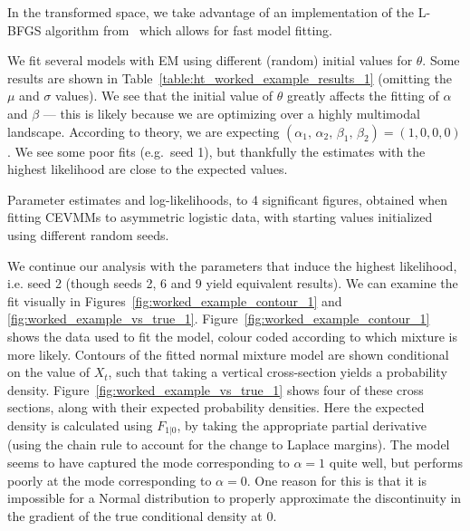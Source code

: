 \documentclass[11pt,twoside,openany]{book}
\numberwithin{Theorem}{chapter}
\numberwithin{Definition}{chapter}
\numberwithin{Lemma}{chapter}
\numberwithin{Algorithm}{chapter}
\numberwithin{equation}{chapter}
\begin{document}
In the transformed space, we take advantage of
an implementation of the L-BFGS algorithm from~\cite{mogensen2018optim} which
allows for fast model fitting.

We fit several models with EM using different (random) initial values
for $\theta$. Some results are shown in
Table~\ref{table:ht_worked_example_results_1} (omitting the $\mu$ and $\sigma$
values).
We see that the initial value of $\theta$ greatly affects the fitting of $\alpha$ and $\beta$ ---
this is likely because we are optimizing over a highly multimodal landscape.
According to theory, we are expecting $(\alpha_1,\,\alpha_2,\,\beta_1,\,\beta_2) = (1,0,0,0)$.
We see some poor fits (e.g.\ seed 1), but thankfully the estimates
with the highest likelihood are close to the expected values.



\begin{table}[htp]\centering
   \caption{Parameter estimates
  and log-likelihoods, to 4 significant figures, obtained when fitting CEVMMs
to asymmetric logistic data, with starting values initialized using different
random seeds.\label{table:ht_worked_example_results_1} }
\end{table}

We continue our analysis with the parameters that induce the highest
likelihood, i.e.
seed 2 (though seeds 2, 6 and 9 yield equivalent results).
We can examine the fit visually in Figures~\ref{fig:worked_example_contour_1} and
\ref{fig:worked_example_vs_true_1}. Figure~\ref{fig:worked_example_contour_1}
shows the data used to fit the model, colour coded according to which mixture is
more likely. Contours of the fitted normal mixture model are shown conditional on the value of $X_t$,
such that taking a vertical cross-section yields a probability density.
Figure~\ref{fig:worked_example_vs_true_1} shows four of these cross sections,
along with their expected probability densities. Here the expected density
is calculated using $F_{1|0}$, by taking the appropriate partial derivative
(using the chain rule to account for the change to Laplace margins).
The model seems to have captured the mode corresponding to $\alpha=1$ quite well,
but performs poorly at the mode corresponding to $\alpha=0$. One reason for
this is that it is impossible for a Normal distribution to properly approximate
the discontinuity in the gradient of the true conditional density at $0$.
\end{document}
